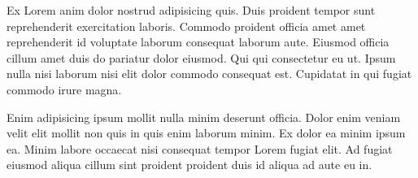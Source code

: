 
Ex Lorem anim dolor nostrud adipisicing quis. Duis proident tempor sunt reprehenderit exercitation laboris. Commodo proident officia amet amet reprehenderit id voluptate laborum consequat laborum aute. Eiusmod officia cillum amet duis do pariatur dolor eiusmod. Qui qui consectetur eu ut. Ipsum nulla nisi laborum nisi elit dolor commodo consequat est. Cupidatat in qui fugiat commodo irure magna.

Enim adipisicing ipsum mollit nulla minim deserunt officia. Dolor enim veniam velit elit mollit non quis in quis enim laborum minim. Ex dolor ea minim ipsum ea. Minim labore occaecat nisi consequat tempor Lorem fugiat elit. Ad fugiat eiusmod aliqua cillum sint proident proident duis id aliqua ad aute eu in.

